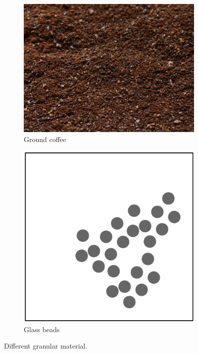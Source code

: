 \begin{figure}
\centering
\begin{subfigure}{.44\textwidth}
  \centering
  \includegraphics[width=\linewidth]{figures/jamming/coffee-grains}
  \caption{Ground coffee}
\end{subfigure}%
\hspace{0.02\textwidth}
\begin{subfigure}{.44\textwidth}
  \centering
  \includegraphics[width=\linewidth]{figures/jamming/glass-beads}
  \caption{Glass beads}
\end{subfigure}
\caption{Different granular material.}
\label{fig:ch:jamming:particles-close-up}
\end{figure}

